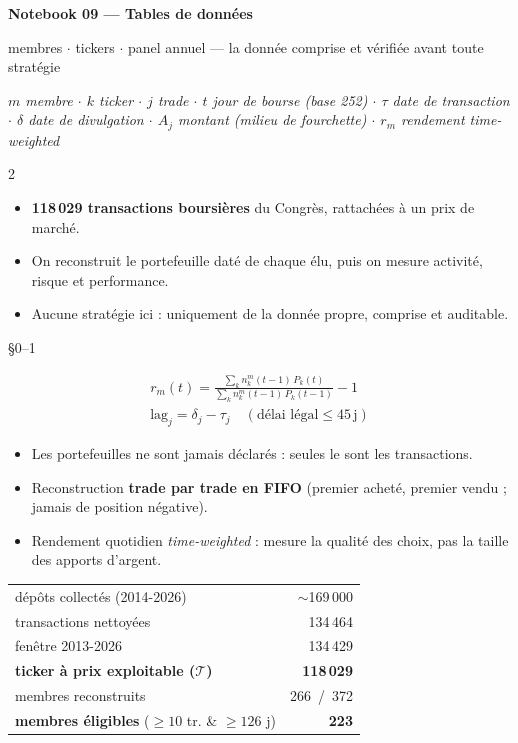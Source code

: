 \documentclass[11pt,a4paper]{article}
\newcommand{\titre}[2]{\vspace{4pt}{\large\bfseries\color{bleu}#1}\hfill{\footnotesize\color{gris}#2}\par
  \vspace{0pt}{\color{bleu}\hrule height 0.6pt}\vspace{4pt}}
\newcommand{\fin}{\vspace{4pt}{\color{gris}\hrule}\vspace{5pt}}
\begin{document}
{\centering
{\LARGE\bfseries Notebook 09 --- Tables de données\par}
\vspace{2pt}
{\small\color{gris}membres $\cdot$ tickers $\cdot$ panel annuel --- la donnée comprise et vérifiée avant toute stratégie\par}
\vspace{4pt}
{\footnotesize\itshape $m$ membre $\cdot$ $k$ ticker $\cdot$ $j$ trade $\cdot$ $t$ jour de bourse (base 252) $\cdot$
$\tau$ date de transaction $\cdot$ $\delta$ date de divulgation $\cdot$ $A_j$ montant (milieu de fourchette) $\cdot$
$r_m$ rendement \emph{time-weighted}\par}
\vspace{6pt}\par}

\begin{multicols}{2}

\begin{itemize}
\item \textbf{118\,029 transactions boursières} du Congrès, rattachées à un prix de marché.
\item On reconstruit le portefeuille daté de chaque élu, puis on mesure activité, risque et performance.
\item Aucune stratégie ici : uniquement de la donnée propre, comprise et auditable.
\end{itemize}
\fin

\titre{1. Le moteur}{\S{}0--1}
{\small
\begin{gather*}
r_m(t)=\frac{\sum_k n_k^m(t{-}1)\,P_k(t)}{\sum_k n_k^m(t{-}1)\,P_k(t{-}1)}-1 \\[3pt]
\mathrm{lag}_j=\delta_j-\tau_j\quad(\text{délai légal}\le 45\,\text{j})
\end{gather*}}
\begin{itemize}
\item Les portefeuilles ne sont jamais déclarés : seules le sont les transactions.
\item Reconstruction \textbf{trade par trade en FIFO} (premier acheté, premier vendu ; jamais de position négative).
\item Rendement quotidien \emph{time-weighted} : mesure la qualité des choix, pas la taille des apports d'argent.
\end{itemize}
\vspace{2pt}
\begin{center}\footnotesize
\begin{tabular}{@{}lr@{}}
\toprule
dépôts collectés (2014-2026) & $\sim$169\,000\\
transactions nettoyées & 134\,464\\
fenêtre 2013-2026 & 134\,429\\
\textbf{ticker à prix exploitable ($\mathcal{T}$)} & \textbf{118\,029}\\
\midrule
membres reconstruits & 266\ /\ 372\\
\textbf{membres éligibles} ($\ge 10$ tr. \& $\ge 126$ j) & \textbf{223}\\
\bottomrule
\end{tabular}
\end{center}
\fin


\end{multicols}
\end{document}
